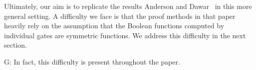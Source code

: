 \documentclass[../paper.tex]{subfiles}
\begin{document}
Ultimately, our aim is to replicate the results Anderson and
Dawar~\cite{AndersonD17} in this more general setting. A difficulty we face is
that the proof methods in that paper heavily rely on the assumption that the
Boolean functions computed by individual gates are symmetric functions. We
address this difficulty in the next section.

\begin{drem}
  G: In fact, this difficulty is present throughout the paper.
\end{drem}



\end{document}
